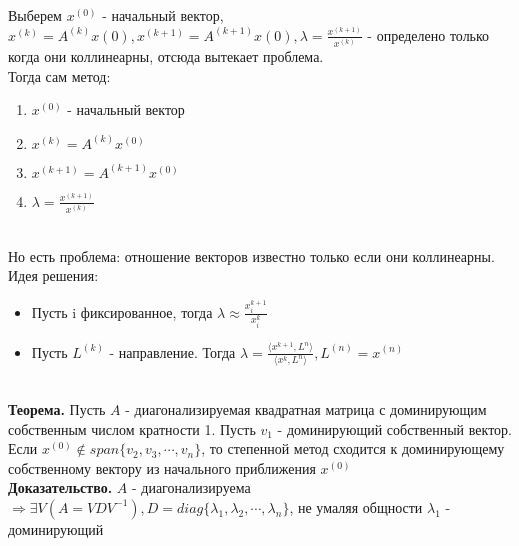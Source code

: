     Выберем \(x^{(0)}\) - начальный вектор,\( x^{(k)} = A^{(k)}x{(0)}, x^{(k + 1)} = A^{(k + 1)}x{(0)}, \lambda = \frac{x^{(k+1)}}{x^{(k)}}\) - определено только когда они коллинеарны, отсюда вытекает проблема. \\
    Тогда сам метод: 
    \begin{enumerate}
        \item $x^{(0)}$ - начальный вектор 
        \item $x^{(k)} = A^{(k)}x^{(0)}$
        \item $x^{(k+1)} = A^{(k+1)}x^{(0)}$
        \item $\lambda = \frac{x^{(k+1)}}{x^{(k)}}$
    \end{enumerate}
    \\  
    Но есть проблема: отношение векторов известно только если они коллинеарны.
    \\ Идея решения:
    \begin{itemize}
        \item Пусть i фиксированное, тогда \(\lambda \approx \frac{x_i^{k+1}}{x_i^{k}}\)
        \item Пусть \(L^{(k)}\) - направление. Тогда \(\lambda = \frac{\langle x^{k+1}, L^{n} \rangle}{\langle x^{k}, L^{n} \rangle}, L^{(n)} = x^{(n)}\)
    \end{itemize} \\

    \textbf{Теорема.} Пусть \(A\) - диагонализируемая квадратная матрица с доминирующим собственным числом кратности 1. Пусть \(v_1\) - доминирующий собственный вектор. Если \(x^{(0)} \notin span\{v_2,v_3,\cdots,v_n\}\), то степенной метод сходится к доминирующему собственному вектору из начального приближения \(x^{(0)}\) \\

    \textbf{Доказательство.} \(A\) - диагонализируема \(\Rightarrow \exists V(A = VDV^{-1}), D = diag \{\lambda_1, \lambda_2, \cdots, \lambda_n\}\), не умаляя общности \(\lambda_1\) - доминирующий \\

